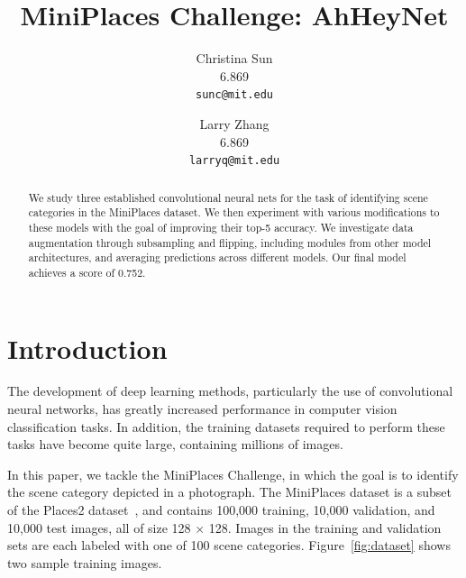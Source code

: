 \documentclass[10pt,twocolumn,letterpaper]{article}
\begin{document}
\title{MiniPlaces Challenge: AhHeyNet}

\author{Christina Sun\\
6.869\\
{\tt\small sunc@mit.edu}
\and
Larry Zhang\\
6.869\\
{\tt\small larryq@mit.edu}
}

\maketitle

\begin{abstract}
   We study three established convolutional neural nets for the task of identifying scene categories in the MiniPlaces dataset. We then experiment with various modifications to these models with the goal of improving their top-5 accuracy. We investigate data augmentation through subsampling and flipping, including modules from other model architectures, and averaging predictions across different models. Our final model achieves a score of 0.752.
\end{abstract}

\section{Introduction}

The development of deep learning methods, particularly the use of convolutional neural networks, has greatly increased performance in computer vision classification tasks. In addition, the training datasets required to perform these tasks have become quite large, containing millions of images.

In this paper, we tackle the MiniPlaces Challenge, in which the goal is to identify the scene category depicted in a photograph. The MiniPlaces dataset is a subset of the Places2 dataset~\cite{places2}, and contains 100,000 training, 10,000 validation, and 10,000 test images, all of size 128 $\times$ 128. Images in the training and validation sets are each labeled with one of 100 scene categories. Figure~\ref{fig:dataset} shows two sample training images.
\end{document}
